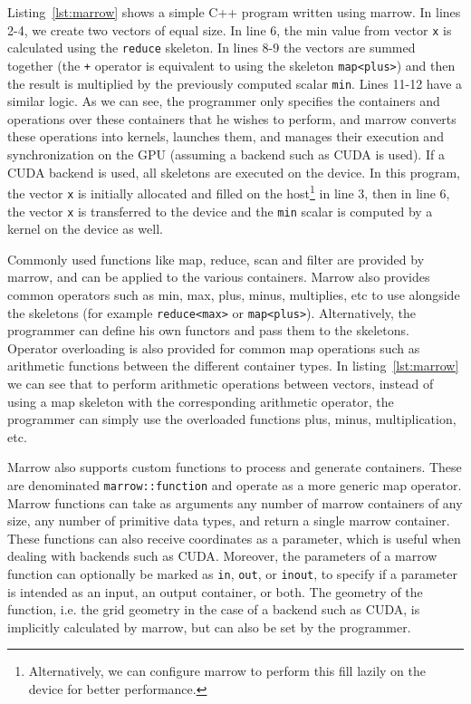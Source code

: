 Listing~\ref{lst:marrow} shows a simple C++ program written using marrow. In lines 2-4, we create two vectors of equal size. In line 6, the min value from vector \texttt{x} is calculated using the \texttt{reduce} skeleton. In lines 8-9 the vectors are summed together (the \texttt{+} operator is equivalent to using the skeleton \texttt{map<plus>}) and then the result is multiplied by the previously computed scalar \texttt{min}. Lines 11-12 have a similar logic. As we can see, the programmer only specifies the containers and operations over these containers that he wishes to perform, and marrow converts these operations into kernels, launches them, and manages their execution and synchronization on the \gls{GPU} (assuming a backend such as \gls{CUDA} is used).  If a \gls{CUDA} backend is used, all skeletons are executed on the device. In this program, the vector \texttt{x} is initially allocated and filled on the host\footnote{Alternatively, we can configure marrow to perform this fill lazily on the device for better performance.} in line 3, then in line 6, the vector \texttt{x} is transferred to the device and the \texttt{min} scalar is computed by a kernel on the device as well.

Commonly used functions like map, reduce, scan and filter are provided by marrow, and can be applied to the various containers. Marrow also provides common operators such as min, max, plus, minus, multiplies, etc to use alongside the skeletons (for example \texttt{reduce<max>} or \texttt{map<plus>}). Alternatively, the programmer can define his own functors and pass them to the skeletons. Operator overloading is also provided for common map operations such as arithmetic functions between the different container types. In listing~\ref{lst:marrow} we can see that to perform arithmetic operations between vectors, instead of using a map skeleton with the corresponding arithmetic operator, the programmer can simply use the overloaded functions plus, minus, multiplication, etc.

Marrow also supports custom functions to process and generate containers. These are denominated \texttt{marrow::function} and operate as a more generic map operator. Marrow functions can take as arguments any number of marrow containers of any size, any number of primitive data types, and return a single marrow container. These functions can also receive coordinates as a parameter, which is useful when dealing with backends such as \gls{CUDA}. Moreover, the parameters of a marrow function can optionally be marked as \texttt{in}, \texttt{out}, or \texttt{inout}, to specify if a parameter is intended as an input, an output container, or both. The geometry of the function, i.e. the grid geometry in the case of a backend such as \gls{CUDA}, is implicitly calculated by marrow, but can also be set by the programmer. 

